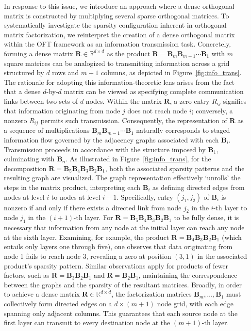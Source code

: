 In response to this issue, we introduce an approach where a dense orthogonal matrix is constructed by multiplying several sparse orthogonal matrices. To systematically investigate the sparsity configuration inherent in orthogonal matrix factorization, we reinterpret the creation of a dense orthogonal matrix within the OFT framework as an information transmission task. Concretely, forming a dense matrix $\bm{R}\in\mathbb{R}^{d\times d}$ as the product $\bm{R} = \bm{B}_m\bm{B}_{m-1}\cdots\bm{B}_1$ with $m$ square matrices can be analogized to transmitting information across a grid structured by $d$ rows and $m+1$ columns, as depicted in Figure~\ref{fig:info_trans}. The rationale for adopting this information-theoretic lens arises from the fact that a dense $d$-by-$d$ matrix can be viewed as specifying complete communication links between two sets of $d$ nodes. Within the matrix $\bm{R}$, a zero entry $R_{ij}$ signifies that information originating from node $j$ does not reach node $i$; conversely, a nonzero $R_{ij}$ permits such transmission. Consequently, the representation of $\bm{R}$ as a sequence of multiplications $\bm{B}_m\bm{B}_{m-1}\cdots\bm{B}_1$ naturally corresponds to staged information flow governed by the adjacency graphs associated with each $\bm{B}_i$. Transmission proceeds in accordance with the structure imposed by $\bm{B}_1$, culminating with $\bm{B}_n$. As illustrated in Figure~\ref{fig:info_trans}, for the decomposition $\bm{R} = \bm{B}_5\bm{B}_4\bm{B}_3\bm{B}_2\bm{B}_1$, both the associated sparsity patterns and the resulting graph are visualized. The graph representation effectively ‘unrolls’ the steps in the matrix product, interpreting each $\bm{B}_i$ as defining directed edges from nodes at level $i$ to nodes at level $i+1$. Specifically, entry $(j_1,j_2)$ of $\bm{B}_i$ is nonzero if and only if there exists a directed link from node $j_2$ in the $i$-th layer to node $j_1$ in the $(i+1)$-th layer. For $\bm{R} = \bm{B}_5\bm{B}_4\bm{B}_3\bm{B}_2\bm{B}_1$ to be fully dense, it is necessary that information from any node at the initial layer can reach any node at the sixth layer. Examining, for example, the product $\bm{R} = \bm{B}_4\bm{B}_3\bm{B}_2\bm{B}_1$ (which entails only layers one through five), one observes that data originating from node 1 fails to reach node 3, revealing a zero at position $(3,1)$ in the associated product’s sparsity pattern. Similar observations apply for products of fewer factors, such as $\bm{R} = \bm{B}_3\bm{B}_2\bm{B}_1$ and $\bm{R} = \bm{B}_2\bm{B}_1$, maintaining the correspondence between the graphs and the sparsity of the resultant matrices. Broadly, in order to achieve a dense matrix $\bm{R}\in\mathbb{R}^{d\times d}$, the factorization matrices $\bm{B}_m,\dots,\bm{B}_1$ must collectively form directed edges on a $d\times (m+1)$ node grid, with each edge spanning only adjacent columns. This guarantees that each source node at the first layer can transmit to every destination node at the $(m+1)$-th layer.

